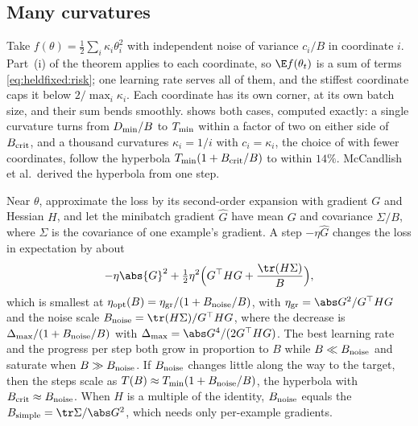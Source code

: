\begin{refsection}
\subsection{Many curvatures}\label{sec:heldfixed:many}

Take $f(\theta)=\frac12\sum_i\kappa_i\theta_i^2$ with independent noise of variance $c_i/B$ in coordinate $i$. Part~(i) of the theorem applies to each coordinate, so $\E f(\theta_t)$ is a sum of terms \eqref{eq:heldfixed:risk}; one learning rate serves all of them, and the stiffest coordinate caps it below $2/\max_i\kappa_i$. Each coordinate has its own corner, at its own batch size, and their sum bends smoothly.  shows both cases, computed exactly: a single curvature turns from $D_{\min}/B$ to $T_{\min}$ within a factor of two on either side of $B_{\mathrm{crit}}$, and a thousand curvatures $\kappa_i=1/i$ with $c_i=\kappa_i$, the choice of \textcite{ZhangEtAl2019} with fewer coordinates, follow the hyperbola $T_{\min}(1+B_{\mathrm{crit}}/B)$ to within $14\%$. McCandlish et al.\ derived the hyperbola from one step.

\begin{heuristic}
Near $\theta$, approximate the loss by its second-order expansion with gradient $G$ and Hessian $H$, and let the minibatch gradient $\hat G$ have mean $G$ and covariance $\Sigma/B$, where $\Sigma$ is the covariance of one example's gradient. A step $-\eta\hat G$ changes the loss in expectation by about
\[
-\eta\abs{G}^2+\tfrac12\eta^2\Bigl(G^\top HG+\frac{\tr(H\Sigma)}B\Bigr),
\]
which is smallest at $\eta_{\mathrm{opt}}(B)=\eta_{\mathrm{gr}}/(1+B_{\mathrm{noise}}/B)$, with $\eta_{\mathrm{gr}}=\abs G^2/G^\top HG$ and the noise scale $\heldfixedBnoise=\tr(H\Sigma)/G^\top HG$, where the decrease is $\Delta_{\max}/(1+B_{\mathrm{noise}}/B)$ with $\Delta_{\max}=\abs G^4/(2G^\top HG)$. The best learning rate and the progress per step both grow in proportion to $B$ while $B\ll B_{\mathrm{noise}}$ and saturate when $B\gg B_{\mathrm{noise}}$. If $B_{\mathrm{noise}}$ changes little along the way to the target, then the steps scale as $T(B)\approx T_{\min}(1+B_{\mathrm{noise}}/B)$, the hyperbola with $B_{\mathrm{crit}}\approx B_{\mathrm{noise}}$. When $H$ is a multiple of the identity, $B_{\mathrm{noise}}$ equals the  $\heldfixedBsimple=\tr\Sigma/\abs G^2$, which needs only per-example gradients.
\end{heuristic}


\end{refsection}
